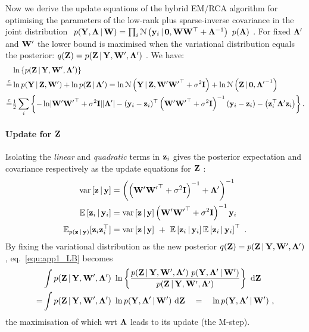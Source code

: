       Now we derive the update equations of the hybrid EM/RCA algorithm for optimising the parameters of the low-rank plus sparse-inverse covariance in the joint distribution $~p(\mathbf{Y}, \mathbf{\Lambda} \,|\, \mathbf{W}) = \prod_i \mathcal{N} \left(  \mathbf{y}_i \,|\, \mathbf{0} ,  \mathbf{W} \mathbf{W}^\top + \mathbf{\Lambda}^{-1}  \right)~p(\mathbf{\Lambda})~$. For fixed $\mathbf{\Lambda}^\prime$ and $\mathbf{W}^\prime$ the lower bound is maximised when the variational distribution equals the posterior: $q(\mathbf{Z}) = p(\mathbf{Z}\,|\,\mathbf{Y},\mathbf{W}^\prime,\mathbf{\Lambda}^\prime)~$. We have:
      \begin{align*}
	& \ln \left \{ p(\mathbf{Z}\,|\,\mathbf{Y},\mathbf{W}^\prime,\mathbf{\Lambda}^\prime) \right\} \\
	\overset{c}{=} &\ln p(\mathbf{Y}\,|\,\mathbf{Z},\mathbf{W}^\prime) + \ln p(\mathbf{Z} \,|\, \mathbf{\Lambda}^\prime)
	= \ln \mathcal{N} \left( \mathbf{Y}\,|\,\mathbf{Z}, \mathbf{W}^\prime { \mathbf{W} ^\prime}^\top + \sigma^2 \mathbf{I}   \right) + \ln \mathcal{N} \left(  \mathbf{Z} \,|\,\mathbf{0} ,  {\mathbf{\Lambda}^\prime}^{-1}  \right) \\
	\overset{c}{=} & \tfrac{1}{2} \sum_i \left\{ - \ln \lvert \mathbf{W}^\prime { \mathbf{W} ^\prime}^\top + \sigma^2 \mathbf{I} \rvert\lvert \mathbf{\Lambda}^\prime \rvert - (\mathbf{y}_i - \mathbf{z}_i)^\top \left( \mathbf{W}^\prime { \mathbf{W} ^\prime}^\top + \sigma^2 \mathbf{I} \right)^{-1} (\mathbf{y}_i - \mathbf{z}_i) - \left( \mathbf{z}_i^\top \mathbf{\Lambda}^\prime \mathbf{z}_i \right) \right\} .
      \end{align*}

      \paragraph{Update for $\mathbf{Z}$} Isolating the \emph{linear} and \emph{quadratic} terms in $\mathbf{z}_i$ gives the posterior expectation and covariance respectively as the update equations for $\mathbf{Z}~$:
      \begin{align}
	\textrm{var}\left[\mathbf{z} \,|\, \mathbf{y}\right] &= \left( \left( \mathbf{W}^\prime { \mathbf{W} ^\prime}^\top + \sigma^2\mathbf{I} \right)^{-1} + \mathbf{\Lambda}^\prime \right)^{-1} \\
	\mathbb{E}\left[ \mathbf{z}_i \,|\, \mathbf{y}_i \right] &= \textrm{var}\left[\mathbf{z} \,|\, \mathbf{y}\right] \left ( \mathbf{W}^\prime { \mathbf{W} ^\prime}^\top + \sigma^2\mathbf{I} \right)^{-1} \mathbf{y}_i \\
	\label{equ:app1_Zsecmoment} \mathbb{E}_{p(\mathbf{z}\,|\,\mathbf{y})}[ \mathbf{z}_i \mathbf{z}_i^\top ] &= \textrm{var}\left[ \mathbf{z} \,|\, \mathbf{y} \right] ~+~ \mathbb{E}\left[ \mathbf{z}_i \,|\, \mathbf{y}_i \right] \mathbb{E}\left[ \mathbf{z}_i \,|\, \mathbf{y}_i \right]^\top ~.
      \end{align}
      By fixing the variational distribution as the new posterior $q(\mathbf{Z}) = p(\mathbf{Z} \,|\, \mathbf{Y}, \mathbf{W}^\prime, \mathbf{\Lambda}^\prime )$, eq.~\eqref{equ:app1_LB} becomes
      \begin{align*}
	\nonumber & \int p(\mathbf{Z} \,|\, \mathbf{Y}, \mathbf{W}^\prime, \mathbf{\Lambda}^\prime ) ~ \ln \left\{ \frac{ p(\mathbf{Z} \,|\, \mathbf{Y}, \mathbf{W}^\prime, \mathbf{\Lambda}^\prime ) ~ p(\mathbf{Y}, \mathbf{\Lambda}^\prime \,|\, \mathbf{W}^\prime) }{ p(\mathbf{Z} \,|\, \mathbf{Y}, \mathbf{W}^\prime, \mathbf{\Lambda}^\prime ) } \right\} ~ \textrm{d} \mathbf{Z} \\
	= &\int p(\mathbf{Z} \,|\, \mathbf{Y}, \mathbf{W}^\prime, \mathbf{\Lambda}^\prime ) ~ \ln p(\mathbf{Y}, \mathbf{\Lambda}^\prime \,|\, \mathbf{W}^\prime) ~ \textrm{d} \mathbf{Z}
	\quad = \quad \ln p(\mathbf{Y}, \mathbf{\Lambda}^\prime \,|\, \mathbf{W}^\prime) ~,
      \end{align*}
      the maximisation of which wrt $\mathbf{\Lambda}$ leads to its update (the M-step).

